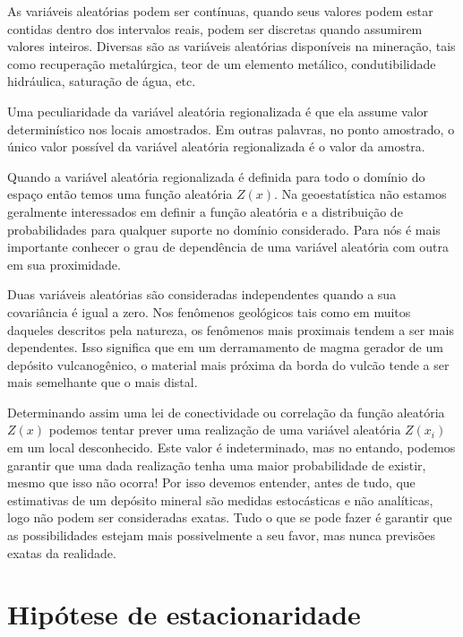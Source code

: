As variáveis aleatórias podem ser contínuas, quando seus valores podem estar contidas dentro dos intervalos reais, podem ser discretas quando assumirem valores inteiros. Diversas são as variáveis aleatórias disponíveis na mineração, tais como recuperação metalúrgica, teor de um elemento metálico, condutibilidade hidráulica, saturação de água, etc. 

Uma peculiaridade da variável aleatória regionalizada é que ela assume valor determinístico nos locais amostrados. Em outras palavras, no ponto amostrado, o único valor possível da variável aleatória regionalizada é o valor da amostra. 

Quando a variável aleatória regionalizada é definida para todo o domínio do espaço então temos uma função aleatória $Z(x)$. Na geoestatística não estamos geralmente interessados em definir a função aleatória e a distribuição de probabilidades para qualquer suporte no domínio considerado. Para nós é mais importante conhecer o grau de dependência de uma variável aleatória com outra em sua proximidade. 

Duas variáveis aleatórias são consideradas independentes quando a sua covariância é igual a zero. Nos fenômenos geológicos tais como em muitos daqueles descritos pela natureza, os fenômenos mais proximais tendem a ser mais dependentes. Isso significa que em um derramamento de magma gerador de um depósito vulcanogênico, o material mais próxima da borda do vulcão tende a ser mais semelhante que o mais distal.

Determinando assim uma lei de conectividade ou correlação da função aleatória $Z(x)$ podemos tentar prever uma realização de uma variável aleatória $Z(x_{i})$ em um local desconhecido. Este valor é indeterminado, mas no entando, podemos garantir que uma dada realização tenha uma maior probabilidade de existir, mesmo que isso não ocorra! Por isso devemos entender, antes de tudo, que estimativas de um depósito mineral são medidas estocásticas e não analíticas, logo não podem ser consideradas exatas. Tudo o que se pode fazer é garantir que as possibilidades estejam mais possivelmente a seu favor, mas nunca previsões exatas da realidade. 

\section{Hipótese de estacionaridade}

